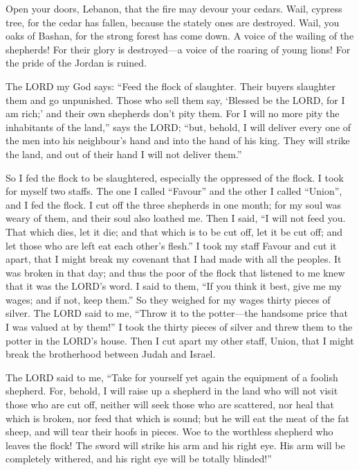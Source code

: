  Open your doors, Lebanon, that the fire may devour your
cedars.  Wail, cypress tree, for the cedar has fallen,
because the stately ones are destroyed. Wail, you oaks of Bashan, for
the strong forest has come down.  A voice of the wailing of
the shepherds! For their glory is destroyed---a voice of the roaring of
young lions! For the pride of the Jordan is ruined.

 The LORD my God says: ``Feed the flock of slaughter.
 Their buyers slaughter them and go unpunished. Those who
sell them say, `Blessed be the LORD, for I am rich;' and their own
shepherds don't pity them.  For I will no more pity the
inhabitants of the land,'' says the LORD; ``but, behold, I will deliver
every one of the men into his neighbour's hand and into the hand of his
king. They will strike the land, and out of their hand I will not
deliver them.''

 So I fed the flock to be slaughtered, especially the
oppressed of the flock. I took for myself two staffs. The one I called
``Favour'' and the other I called ``Union'', and I fed the flock.
 I cut off the three shepherds in one month; for my soul was
weary of them, and their soul also loathed me.  Then I said,
``I will not feed you. That which dies, let it die; and that which is to
be cut off, let it be cut off; and let those who are left eat each
other's flesh.''  I took my staff Favour and cut it apart,
that I might break my covenant that I had made with all the peoples.
 It was broken in that day; and thus the poor of the flock
that listened to me knew that it was the LORD's word.  I
said to them, ``If you think it best, give me my wages; and if not, keep
them.'' So they weighed for my wages thirty pieces of silver.
 The LORD said to me, ``Throw it to the potter---the
handsome price that I was valued at by them!'' I took the thirty pieces
of silver and threw them to the potter in the LORD's house.
 Then I cut apart my other staff, Union, that I might break
the brotherhood between Judah and Israel.

 The LORD said to me, ``Take for yourself yet again the
equipment of a foolish shepherd.  For, behold, I will raise
up a shepherd in the land who will not visit those who are cut off,
neither will seek those who are scattered, nor heal that which is
broken, nor feed that which is sound; but he will eat the meat of the
fat sheep, and will tear their hoofs in pieces.  Woe to the
worthless shepherd who leaves the flock! The sword will strike his arm
and his right eye. His arm will be completely withered, and his right
eye will be totally blinded!''

